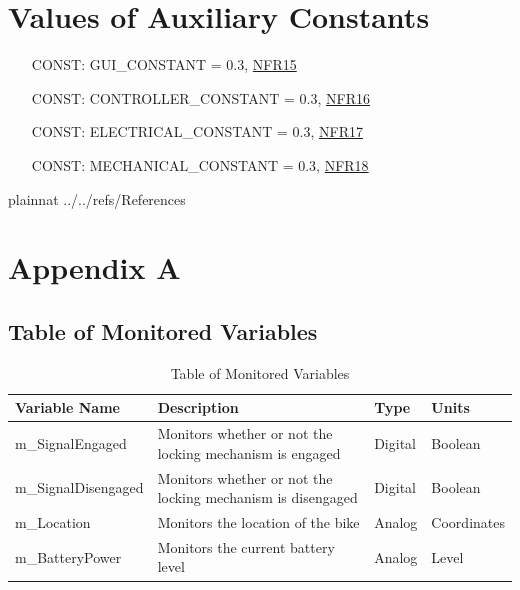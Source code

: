 \documentclass[12pt]{article}
\newcounter{constnum} %
\begin{document}
\section{Values of Auxiliary Constants}

\begin{itemize}
\setlength{\itemindent}{0.5in} \item[CONST\refstepcounter{constnum}\theconstnum\label{LC_meaningfulLabel}:] GUI\_CONSTANT = 0.3, \hyperref[NFRGUI]{NFR15}
\item[CONST\refstepcounter{constnum}\theconstnum\label{LC_meaningfulLabel}:] CONTROLLER\_CONSTANT = 0.3, \hyperref[NFRController]{NFR16}
\item[CONST\refstepcounter{constnum}\theconstnum\label{LC_meaningfulLabel}:] ELECTRICAL\_CONSTANT = 0.3, \hyperref[NFRCircuit]{NFR17}
\item[CONST\refstepcounter{constnum}\theconstnum\label{LC_meaningfulLabel}:] MECHANICAL\_CONSTANT = 0.3, \hyperref[NFRMech]{NFR18}
\end{itemize}

\newpage

 {plainnat}
 {../../refs/References}

\newpage
\section{Appendix A}
\subsection{Table of Monitored Variables}
\newpage
\begin{table}
\caption{Table of Monitored Variables} \label{Table of Monitored Variables}
\begin{tabular}{| p{} | p{} | p{} | p{} |}
 \hline
 Variable Name & Description & Type & Units \\ 
 \hline
 m\_SignalEngaged & Monitors whether or not the locking mechanism is engaged & Digital & Boolean \\ 
  \hline
 m\_SignalDisengaged & Monitors whether or not the locking mechanism is disengaged & Digital & Boolean \\ 
  \hline
 m\_Location & Monitors the location of the bike & Analog & Coordinates \\ 
  \hline
 m\_BatteryPower & Monitors the current battery level & Analog & Level \\ 
 \hline
\end{tabular}
\end{table}
\end{document}
